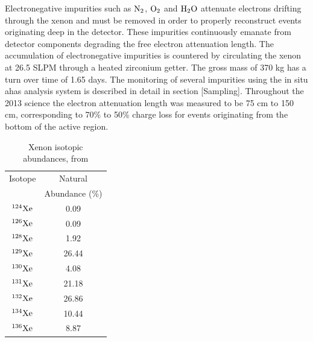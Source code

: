 Electronegative impurities such as $\rm N_2$, $\rm O_2$ and $\rm H_2O$ attenuate electrons drifting through the xenon and must be removed in order to properly reconstruct events originating deep in the detector. These impurities continuously emanate from detector components degrading the free electron attenuation length. The accumulation of electronegative impurities is countered by circulating the xenon at 26.5 SLPM through a heated zirconium getter. The gross mass of 370 kg has a turn over time of 1.65 days. The monitoring of several impurities using the in situ ahas analysis system is described in detail in section [Sampling]. Throughout the 2013 science the electron attenuation length was measured to be 75 cm to 150 cm, corresponding to 70\% to 50\% charge loss for events originating from the bottom of the active region.

\renewcommand{\baselinestretch}{1}
\small\normalsize
\begin{table}[h!]
\begin{center}
\begin{tabular}{|c|c|}
\hline
Isotope & Natural \\
		& Abundance (\%) \\ \hline
$\rm^{124}Xe$ & 0.09 \\ \hline
$\rm^{126}Xe$ & 0.09 \\ \hline
$\rm^{128}Xe$ & 1.92 \\ \hline
$\rm^{129}Xe$ & 26.44 \\ \hline
$\rm^{130}Xe$ & 4.08 \\ \hline
$\rm^{131}Xe$ & 21.18 \\ \hline
$\rm^{132}Xe$ & 26.86 \\ \hline
$\rm^{134}Xe$ & 10.44 \\ \hline
$\rm^{136}Xe$ & 8.87 \\ \hline
\end{tabular}
\caption{Xenon isotopic abundances, from \cite{Xe_Isotopes}}
\label{table:Xe_Isotopes}
\end{center}
\end{table}
\renewcommand{\baselinestretch}{2}
\small\normalsize



